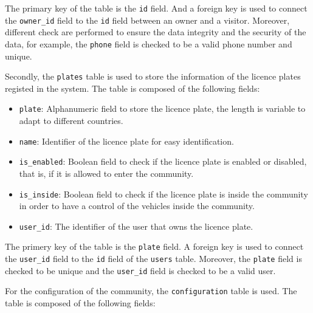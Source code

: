 The primary key of the table is the \texttt{id} field. And a foreign key is used to connect the \texttt{owner\_id} field to the \texttt{id} field between an owner and a visitor. Moreover, different check are performed to ensure the data integrity and the security of the data, for example, the \texttt{phone} field is checked to be a valid phone number and unique.

Secondly, the \texttt{plates} table is used to store the information of the licence plates registed in the system. The table is composed of the following fields:

\begin{itemize}
	\item \texttt{plate}: Alphanumeric field to store the licence plate, the length is variable to adapt to different countries.
	\item \texttt{name}: Identifier of the licence plate for easy identification.
	\item \texttt{is\_enabled}: Boolean field to check if the licence plate is enabled or disabled, that is, if it is allowed to enter the community.
	\item \texttt{is\_inside}: Boolean field to check if the licence plate is inside the community in order to have a control of the vehicles inside the community.
	\item \texttt{user\_id}: The identifier of the user that owns the licence plate.
\end{itemize}

The primery key of the table is the \texttt{plate} field. A foreign key is used to connect the \texttt{user\_id} field to the \texttt{id} field of the \texttt{users} table. Moreover, the \texttt{plate} field is checked to be unique and the \texttt{user\_id} field is checked to be a valid user.

For the configuration of the community, the \texttt{configuration} table is used. The table is composed of the following fields:

